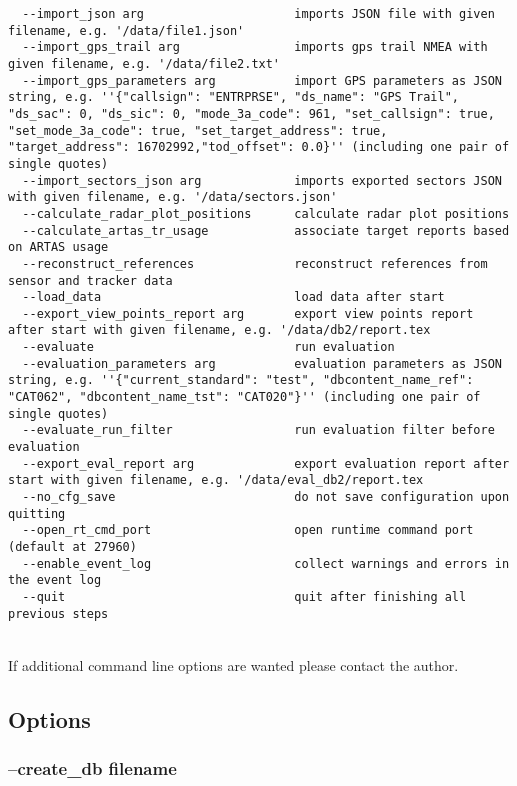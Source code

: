 \begin{lstlisting}
  --import_json arg                     imports JSON file with given filename, e.g. '/data/file1.json'
  --import_gps_trail arg                imports gps trail NMEA with given filename, e.g. '/data/file2.txt'
  --import_gps_parameters arg           import GPS parameters as JSON string, e.g. ''{"callsign": "ENTRPRSE", "ds_name": "GPS Trail", "ds_sac": 0, "ds_sic": 0, "mode_3a_code": 961, "set_callsign": true, "set_mode_3a_code": true, "set_target_address": true, "target_address": 16702992,"tod_offset": 0.0}'' (including one pair of single quotes)
  --import_sectors_json arg             imports exported sectors JSON with given filename, e.g. '/data/sectors.json'
  --calculate_radar_plot_positions      calculate radar plot positions
  --calculate_artas_tr_usage            associate target reports based on ARTAS usage
  --reconstruct_references              reconstruct references from sensor and tracker data
  --load_data                           load data after start
  --export_view_points_report arg       export view points report after start with given filename, e.g. '/data/db2/report.tex
  --evaluate                            run evaluation
  --evaluation_parameters arg           evaluation parameters as JSON string, e.g. ''{"current_standard": "test", "dbcontent_name_ref": "CAT062", "dbcontent_name_tst": "CAT020"}'' (including one pair of single quotes)
  --evaluate_run_filter                 run evaluation filter before evaluation
  --export_eval_report arg              export evaluation report after start with given filename, e.g. '/data/eval_db2/report.tex
  --no_cfg_save                         do not save configuration upon quitting
  --open_rt_cmd_port                    open runtime command port (default at 27960)
  --enable_event_log                    collect warnings and errors in the event log
  --quit                                quit after finishing all previous steps
\end{lstlisting}
\ \\

If additional command line options are wanted please contact the author.

\subsection{Options}

\subsubsection{--create\_db filename}

